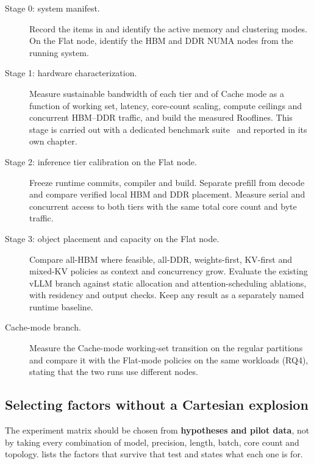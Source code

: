 \begin{description}
  \item[Stage 0: system manifest.] Record the items in
   and identify the active memory and
  clustering modes.  On the Flat node, identify the HBM and DDR NUMA
  nodes from the running system.

  \item[Stage 1: hardware characterization.] Measure sustainable
  bandwidth of each tier and of Cache mode as a function of working set,
  latency, core-count scaling, compute ceilings and concurrent HBM--DDR
  traffic, and build the measured Rooflines.  This stage is carried out
  with a dedicated benchmark suite~\cite{hwbench2026} and reported in its
  own chapter.

  \item[Stage 2: inference tier calibration on the Flat node.]
  Freeze runtime commits,
  compiler and build.  Separate prefill from decode and compare verified
  local HBM and DDR placement.  Measure serial and concurrent access to
  both tiers with the same total core count and byte traffic.

  \item[Stage 3: object placement and capacity on the Flat node.]
  Compare all-HBM where
  feasible, all-DDR, weights-first, KV-first and mixed-KV policies as
  context and concurrency grow.  Evaluate the existing vLLM branch
  against static allocation and attention-scheduling ablations, with
  residency and output checks.  Keep any \lcpp{} result as a separately
  named runtime baseline.

  \item[Cache-mode branch.] Measure the Cache-mode working-set
  transition on the regular partitions and compare it with the Flat-mode
  policies on the same workloads (RQ4), stating that the two runs use
  different nodes.
\end{description}

\subsection{Selecting factors without a Cartesian explosion}

The experiment matrix should be chosen from \textbf{hypotheses and
pilot data}, not by taking every combination of model, precision,
length, batch, core count and topology.   lists the
factors that survive that test and states what each one is for.

